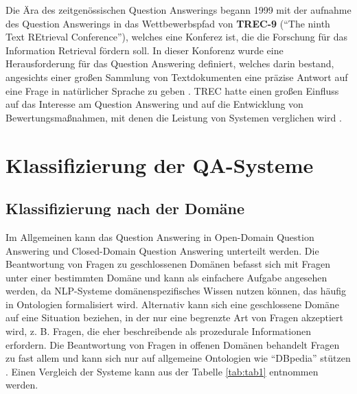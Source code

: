 \documentclass[
        ngerman,
        paper=a4,
        numbers=noendperiod,
]{scrreprt}
\begin{document}
Die Ära des zeitgenössischen Question Answerings begann 1999 mit der aufnahme des Question Answerings in das Wettbewerbspfad von \textbf{TREC-9} (\enquote{The ninth Text REtrieval Conference}), welches eine  Konferez ist, die die Forschung für das Information Retrieval fördern soll. In dieser Konforenz wurde eine Herausforderung für das Question Answering definiert, welches darin bestand, angesichts einer großen Sammlung von Textdokumenten eine präzise Antwort auf eine Frage in natürlicher Sprache zu geben \citep{VoorheesReportTREC-9}. TREC hatte einen großen Einfluss auf das Interesse am Question Answering und auf die Entwicklung von Bewertungsmaßnahmen, mit denen die Leistung von Systemen verglichen wird \citep{voorhees2005trec}. 


\section{Klassifizierung der QA-Systeme}
\subsection{Klassifizierung nach der Domäne}
Im Allgemeinen kann das Question Answering in Open-Domain Question Answering und Closed-Domain Question Answering unterteilt werden. Die Beantwortung von Fragen zu geschlossenen Domänen befasst sich mit Fragen unter einer bestimmten Domäne und kann als einfachere Aufgabe angesehen werden, da NLP-Systeme domänenspezifisches Wissen nutzen können, das häufig in Ontologien formalisiert wird. Alternativ kann sich eine geschlossene Domäne auf eine Situation beziehen, in der nur eine begrenzte Art von Fragen akzeptiert wird, z. B. Fragen, die eher beschreibende als prozedurale Informationen erfordern. Die Beantwortung von Fragen in offenen Domänen behandelt Fragen zu fast allem und kann sich nur auf allgemeine Ontologien wie \enquote{DBpedia} stützen \citep{Mervin2013AnSystem}. Einen Vergleich der Systeme kann aus der Tabelle \ref{tab:tab1} entnommen werden.
\end{document}
